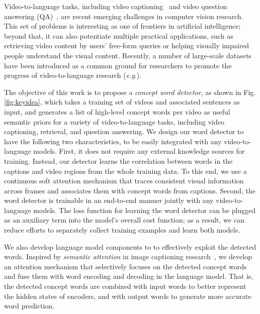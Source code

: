 \documentclass[10pt,twocolumn,letterpaper]{article}
\makeatletter
\theoremstyle{nonumberplain}
\DeclareRobustCommand\onedot{\futurelet\@let@token\@onedot}
\def\onedot{.\@\xspace}
\def\eg{\emph{e.g}\onedot} \def\Eg{\emph{E.g}\onedot}
\makeatother
\begin{document}
Video-to-language tasks, including video captioning~\cite{jeff-cvpr-2015,guadarrama-iccv-2013,rohrbach-gcpr-2015,venugopalan-iccv-2015,xu-aaai-2015,yu-cvpr-2016} and video question answering (QA)~\cite{tapaswi-cvpr-2016}, are recent emerging challenges in computer vision research.
This set of problems is interesting as one of frontiers in artificial intelligence; beyond that, it can also potentiate multiple practical applications, such as retrieving video content by users' free-form queries or  helping visually impaired people understand the visual content.
Recently, a number of large-scale datasets have been introduced as a common ground for researchers to promote the progress of video-to-language research
(\eg \cite{chen-acl-2011,rohrbach-gcpr-2014, rohrbach-ijcv-2017,tapaswi-cvpr-2016}).

The objective of this work is to propose a \emph{concept word detector}, as shown in Fig.\ref{fig:keyidea},
which takes a training set of videos and associated sentences as input, and generates a list of high-level concept words per video as useful semantic priors for a variety of video-to-language tasks, including video captioning, retrieval, and question answering.
We design our word detector to have the following two characteristics, to be easily integrated with any video-to-language models.
First, it does not require any external knowledge sources for training.
Instead, our detector learns the correlation between words in the captions and video regions from the whole training data.
To this end, we use a continuous soft attention mechanism that traces consistent visual information across frames and associates them with concept words from captions.
Second, the word detector is trainable in an end-to-end manner jointly with any video-to-language models.
The loss function for learning the word detector can be plugged as an auxiliary term into the model's overall cost function; as a result, we can reduce efforts to separately collect training examples and learn both models.

We also develop language model components to to effectively exploit the detected words. 
Inspired by \textit{semantic attention} in image captioning research~\cite{quanzeng-cvpr-2016},
we develop an attention mechanism that selectively focuses on the detected concept words and fuse them with word encoding and decoding in the language model.
That is, the detected concept words are combined with input words to better represent the hidden states of encoders, and with output words to generate more accurate word prediction.
\end{document}
